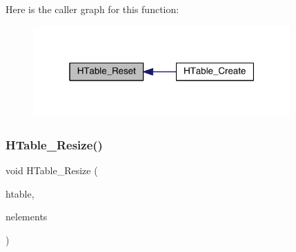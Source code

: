 Here is the caller graph for this function\+:\nopagebreak
\begin{figure}[H]
\begin{center}
\leavevmode
\includegraphics[width=280pt]{a00098_a8a914231592293527bd1f42cdfb346d4_icgraph}
\end{center}
\end{figure}
\mbox{\label{a00098_ad79cb786b03a73481fb3e5846d345801}} 
\subsubsection{\texorpdfstring{H\+Table\+\_\+\+Resize()}{HTable\_Resize()}}
{\footnotesize\ttfamily void H\+Table\+\_\+\+Resize (\begin{DoxyParamCaption}\item[{\hyperlink{a00650}{gk\+\_\+\+H\+Table\+\_\+t} $\ast$}]{htable,  }\item[{int}]{nelements }\end{DoxyParamCaption})}

